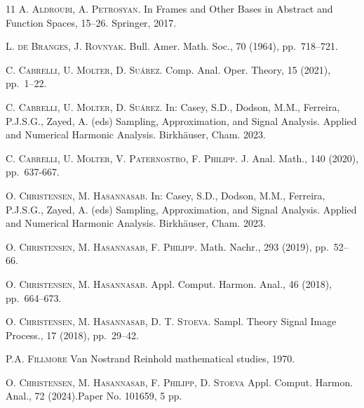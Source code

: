 \documentclass[a4paper,12pt]{amsart}
\theoremstyle{definition}
\begin{document}
\begin{thebibliography}{11}
\textsc{A. Aldroubi, A. Petrosyan.}
In Frames and Other Bases in Abstract and Function Spaces, 15--26. Springer, 2017.

\textsc{L. de Branges, J. Rovnyak.}
Bull. Amer. Math. Soc., 70 (1964), pp.~718--721.

\textsc{C. Cabrelli, U. Molter, D. Suárez.}
Comp. Anal. Oper. Theory, 15 (2021), pp.~1--22.

\textsc{C. Cabrelli, U. Molter, D. Suárez.}
In: Casey, S.D., Dodson, M.M., Ferreira, P.J.S.G., Zayed, A. (eds) Sampling, Approximation, and Signal Analysis. Applied and Numerical Harmonic Analysis. Birkhäuser, Cham. 2023. 

\textsc{C. Cabrelli, U. Molter, V. Paternostro, F. Philipp.}
J. Anal. Math.,  140 (2020), pp.~637-667.

\textsc{O. Christensen, M. Hasannasab.}
In: Casey, S.D., Dodson, M.M., Ferreira, P.J.S.G., Zayed, A. (eds) Sampling, Approximation, and Signal Analysis. Applied and Numerical Harmonic Analysis. Birkh\"auser, Cham. 2023.


\textsc{O. Christensen, M. Hasannasab, F. Philipp.}
Math. Nachr., 293 (2019), pp.~52--66.

\textsc{O. Christensen, M. Hasannasab.}
Appl. Comput. Harmon. Anal., 46 (2018), pp.~664--673.

%
\textsc{O. Christensen, M. Hasannasab, D. T. Stoeva.}
Sampl. Theory Signal Image Process., 17 (2018), pp.~29--42.

\textsc{P.A. Fillmore}
Van Nostrand Reinhold mathematical studies, 1970.

\textsc{O. Christensen, M. Hasannasab, F. Philipp, D. Stoeva}
Appl. Comput. Harmon. Anal., 72 (2024).\newblock Paper No. 101659, 5 pp.



\end{thebibliography}
\end{document}

